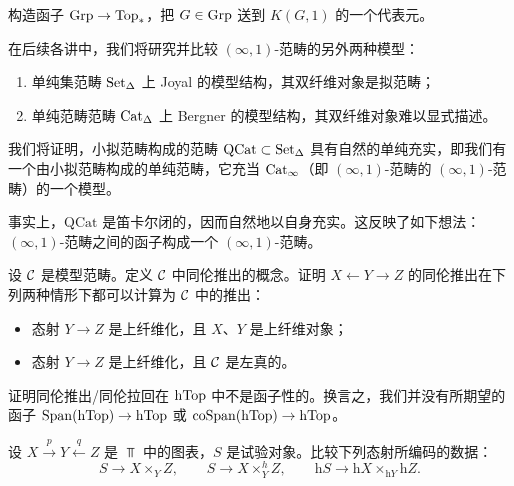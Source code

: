 \begin{challenge}\label{L2-3.9}
构造函子 $\operatorname{Grp}\to\operatorname{Top}_{\ast}$，把 $G\in\operatorname{Grp}$ 送到 $K(G,1)$ 的一个代表元。
\end{challenge}

\nitem\label{L2-3.10} 在后续各讲中，我们将研究并比较 $(\infty,1)$-范畴的另外两种模型：
\begin{enumerate}[label=(\arabic*),leftmargin=2.4em,itemsep=0.1em]
\item 单纯集范畴 $\operatorname{Set}_{\Delta}$ 上 Joyal 的模型结构，其双纤维对象是拟范畴；
\item 单纯范畴范畴 $\operatorname{Cat}_{\Delta}$ 上 Bergner 的模型结构，其双纤维对象难以显式描述。
\end{enumerate}
我们将证明，小拟范畴构成的范畴 $\mathrm{QCat}\subset\operatorname{Set}_{\Delta}$ 具有自然的单纯充实，即我们有一个由小拟范畴构成的单纯范畴，它充当 $\operatorname{Cat}_{\infty}$（即 $(\infty,1)$-范畴的 $(\infty,1)$-范畴）的一个模型。

\begin{remark}\label{L2-3.11}
事实上，$\mathrm{QCat}$ 是笛卡尔闭的，因而自然地以自身充实。这反映了如下想法：$(\infty,1)$-范畴之间的函子构成一个 $(\infty,1)$-范畴。
\end{remark}


\begin{exercise}\label{L2-A.1}
设 $\mathcal{C}$ 是模型范畴。定义 $\mathcal{C}$ 中同伦推出的概念。证明 $X\leftarrow Y\rightarrow Z$ 的同伦推出在下列两种情形下都可以计算为 $\mathcal{C}$ 中的推出：
\begin{itemize}[leftmargin=2.2em,itemsep=0.1em]
\item 态射 $Y\to Z$ 是上纤维化，且 $X$、$Y$ 是上纤维对象；
\item 态射 $Y\to Z$ 是上纤维化，且 $\mathcal{C}$ 是左真的。
\end{itemize}
\end{exercise}


\begin{exercise}\label{L2-A.2}
证明同伦推出/同伦拉回在 $\operatorname{hTop}$ 中不是函子性的。换言之，我们并没有所期望的函子 $\mathrm{Span}(\operatorname{hTop})\to\operatorname{hTop}$ 或 $\mathrm{coSpan}(\operatorname{hTop})\to\operatorname{hTop}$。
\end{exercise}

\begin{exercise}\label{L2-A.3}
设 $X\xrightarrow{p}Y\xleftarrow{q}Z$ 是 $\Top$ 中的图表，$S$ 是试验对象。比较下列态射所编码的数据：
\[
S\to X\times_{Y}Z,\qquad
S\to X\times^{h}_{Y}Z,\qquad
\mathrm{h}S\to\mathrm{h}X\times_{\mathrm{h}Y}\mathrm{h}Z.
\]
\end{exercise}

